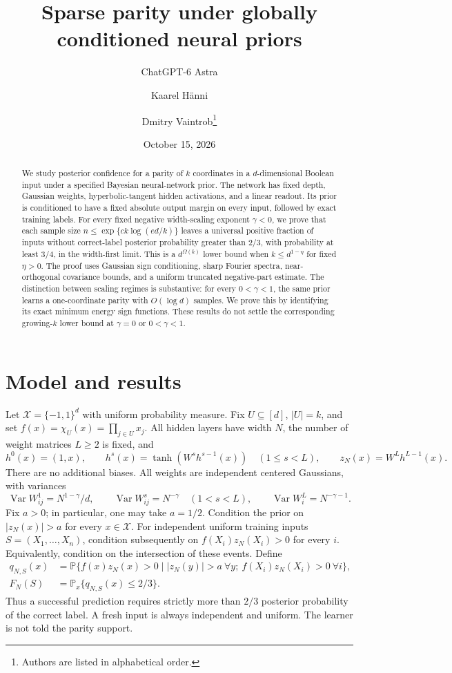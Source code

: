 \documentclass[11pt]{article}
\title{Sparse parity under globally conditioned neural priors}
\author{ChatGPT-6 Astra \and Kaarel H\"anni \and Dmitry Vaintrob\thanks{Authors are listed in alphabetical order.}}
\date{October 15, 2026}
\theoremstyle{remark}\newtheorem{remark}[theorem]{Remark}
\DeclareMathOperator{\Var}{Var}
\begin{document}
\maketitle
\begin{abstract}
We study posterior confidence for a parity of $k$ coordinates in a
$d$-dimensional Boolean input under a specified Bayesian neural-network
prior. The network has fixed depth, Gaussian weights, hyperbolic-tangent
hidden activations, and a linear readout. Its prior is conditioned to have
a fixed absolute output margin on every input, followed by exact training
labels. For every fixed negative width-scaling exponent $\gamma<0$, we
prove that each sample size
$n\le\exp\{c k\log(ed/k)\}$ leaves a universal positive fraction of
inputs without correct-label posterior probability greater than $2/3$,
with probability at least $3/4$, in the width-first limit. This is a
$d^{\Omega(k)}$ lower bound when $k\le d^{1-\eta}$ for fixed $\eta>0$.
The proof uses Gaussian sign conditioning, sharp Fourier spectra,
near-orthogonal covariance bounds, and a uniform truncated negative-part
estimate. The distinction between scaling regimes is substantive:
for every $0<\gamma<1$, the same prior learns a one-coordinate parity
with $O(\log d)$ samples. We prove this by identifying its exact minimum
energy sign functions. These results do not settle the corresponding
growing-$k$ lower bound at $\gamma=0$ or $0<\gamma<1$.
\end{abstract}

\section{Model and results}
Let $\mathcal X=\{-1,1\}^d$ with uniform probability measure.
Fix $U\subseteq[d]$, $|U|=k$, and set
$f(x)=\chi_U(x)=\prod_{j\in U}x_j$.
All hidden layers have width $N$, the number of weight matrices
$L\ge2$ is fixed, and
\[
 h^0(x)=(1,x),\qquad
 h^s(x)=\tanh(W^sh^{s-1}(x))\quad(1\le s<L),
 \qquad z_N(x)=W^Lh^{L-1}(x).
\]
There are no additional biases. All weights are independent centered
Gaussians, with variances
\begin{equation}\label{eq:weights}
 \Var W^1_{ij}=N^{1-\gamma}/d,\qquad
 \Var W^s_{ij}=N^{-\gamma}\quad(1<s<L),\qquad
 \Var W^L_i=N^{-\gamma-1}.
\end{equation}
Fix $a>0$; in particular, one may take $a=1/2$.
Condition the prior on $|z_N(x)|>a$ for every $x\in\mathcal X$.
For independent uniform training inputs $S=(X_1,\ldots,X_n)$,
condition subsequently on $f(X_i)z_N(X_i)>0$ for every $i$.
Equivalently, condition on the intersection of these events.
Define
\begin{align*}
 q_{N,S}(x)&=\mathbb P\{f(x)z_N(x)>0\mid
 |z_N(y)|>a\ \forall y;\ f(X_i)z_N(X_i)>0\ \forall i\},\\
 F_N(S)&=\mathbb P_x\{q_{N,S}(x)\le2/3\}.
\end{align*}
Thus a successful prediction requires strictly more than $2/3$
posterior probability of the correct label. A fresh input is always
independent and uniform. The learner is not told the parity support.
\end{document}
